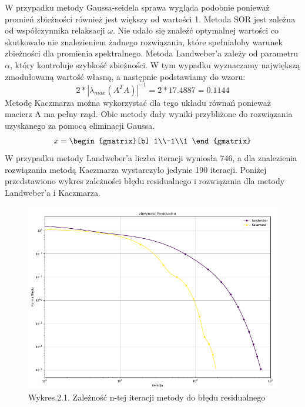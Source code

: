 \documentclass{article}
\begin{document}
W przypadku metody Gaussa-seidela sprawa wygląda podobnie ponieważ promień zbieżności również jest większy od wartości 1.\newline
\newline
Metoda SOR jest zależna od współczynnika relaksacji $\omega$. Nie udało się znaleźć optymalnej wartości co skutkowało nie znalezieniem żadnego rozwiązania, które spełniałoby warunek zbieżności dla promienia spektralnego.\newline
Metoda Landweber'a zależy od parametru $\alpha$, który kontroluje szybkość zbieżności. W tym wypadku wyznaczamy największą zmodułowaną wartość własną, a następnie podstawiamy do wzoru:
\begin{equation}
  2*|\lambda_{max}(A^TA)|^{-1}=2*17.4887=0.1144
\end{equation}
\newline
Metodę Kaczmarza można wykorzystać dla tego układu równań ponieważ macierz A ma pełny rząd.
\newline
Obie metody dały wyniki przybliżone do rozwiązania uzyskanego za pomocą eliminacji Gaussa.
    \begin{equation}
      x= \begin{gmatrix}[b]
        1\\-1\\1        
      \end{gmatrix}
    \end{equation}
W przypadku metody Landweber'a liczba iteracji wyniosła 746, a dla znalezienia rozwiązania metodą Kaczmarza wystarczyło jedynie 190 iteracji.
    Poniżej przedstawiono wykres zależności błędu residualnego i rozwiązania dla metody Landweber'a i Kaczmarza.
\begin{figure}[h]
  \includegraphics[scale=0.7]{Resco.png}
  \centering
  \captionsetup[Tabela]{name=New Table Name}
  \caption*{Wykres.2.1. Zależność n-tej iteracji metody do błędu residualnego}
\end{figure}
\end{document}
